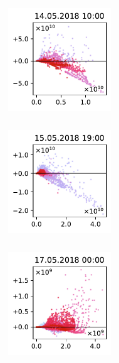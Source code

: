 \begin{figure}[H]
    \centering
    \begin{subfigure}
        \centering
        \includegraphics[width=0.30\textwidth,valign=t]{evaluation/figures/perturbations/perturbation-14.05.2018:10.00-monoterpenes-mul-1.5.pdf}
    \end{subfigure}
    \begin{subfigure}
        \centering
        \includegraphics[width=0.30\textwidth,valign=t]{evaluation/figures/perturbations/perturbation-15.05.2018:19.00-monoterpenes-mul-1.5.pdf}
    \end{subfigure}
    \begin{subfigure}
        \centering
        \includegraphics[width=0.30\textwidth,valign=t]{evaluation/figures/perturbations/perturbation-17.05.2018:00.00-monoterpenes-mul-1.5.pdf}
    \end{subfigure}


\end{figure}
